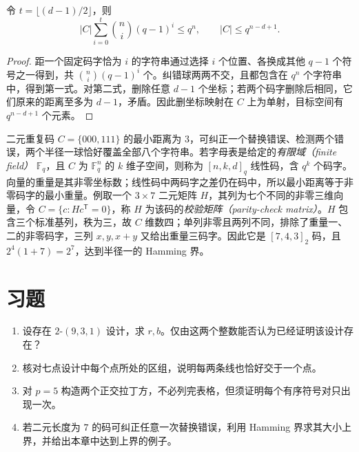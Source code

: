 \begin{theorem}
令 $t=\lfloor(d-1)/2\rfloor$，则
\begin{equation}
 |C|\sum_{i=0}^t\binom ni(q-1)^i\le q^n,
 \qquad |C|\le q^{n-d+1}.
 \label{eq:coding-bounds}
\end{equation}
\end{theorem}
\begin{proof}
距一个固定码字恰为 $i$ 的字符串通过选择 $i$ 个位置、各换成其他 $q-1$ 个符号之一得到，共 $\binom ni(q-1)^i$ 个。纠错球两两不交，且都包含在 $q^n$ 个字符串中，得到第一式。对第二式，删除任意 $d-1$ 个坐标；若两个码字删除后相同，它们原来的距离至多为 $d-1$，矛盾。因此删坐标映射在 $C$ 上为单射，目标空间有 $q^{n-d+1}$ 个元素。
\end{proof}

二元重复码 $C=\{000,111\}$ 的最小距离为 $3$，可纠正一个替换错误、检测两个错误，两个半径一球恰好覆盖全部八个字符串。若字母表是给定的\emph{有限域（finite field）} $\mathbb F_q$，且 $C$ 为 $\mathbb F_q^n$ 的 $k$ 维子空间，则称为 $[n,k,d]_q$ 线性码，含 $q^k$ 个码字。向量的重量是其非零坐标数；线性码中两码字之差仍在码中，所以最小距离等于非零码字的最小重量。例取一个 $3\times7$ 二元矩阵 $H$，其列为七个不同的非零三维向量，令 $C=\{c:Hc^{\mathsf T}=0\}$，称 $H$ 为该码的\emph{校验矩阵（parity-check matrix）}。$H$ 包含三个标准基列，秩为三，故 $C$ 维数四；单列非零且两列不同，排除了重量一、二的非零码字，三列 $x,y,x+y$ 又给出重量三码字。因此它是 $[7,4,3]_2$ 码，且 $2^4(1+7)=2^7$，达到半径一的 Hamming 界。

\section{习题}
\begin{enumerate}
  \item\label{ex:designs-codes-1} 设存在 $2$-$(9,3,1)$ 设计，求 $r,b$。仅由这两个整数能否认为已经证明该设计存在？
  \item\label{ex:designs-codes-2} 核对七点设计中每个点所处的区组，说明每两条线也恰好交于一个点。
  \item\label{ex:designs-codes-3} 对 $p=5$ 构造两个正交拉丁方，不必列完表格，但须证明每个有序符号对只出现一次。
  \item\label{ex:designs-codes-4} 若二元长度为 $7$ 的码可纠正任意一次替换错误，利用 Hamming 界求其大小上界，并给出本章中达到上界的例子。
\end{enumerate}


